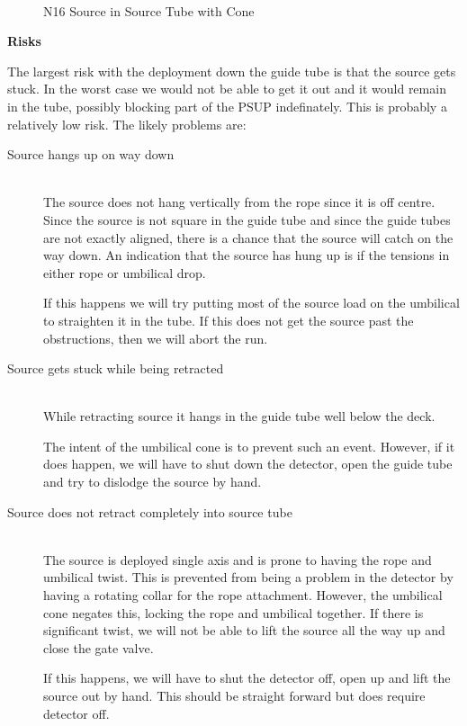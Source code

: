 \begin{figure}
\begin{center}
\leavevmode
\epsfxsize=7in
~\\
\caption[N16 source in Source Tube with Cone]
        {N16 Source in Source Tube with Cone
        } 
        
\end{center}
\end{figure}
  
 
\noindent
{\bf Risks}

  The largest risk with the deployment down the guide tube is
that the source gets stuck.  In the worst case we would not be
able to get it out and it would remain in the tube, possibly blocking
part of the PSUP indefinately.  This is probably a relatively low
risk.  The likely problems are:
\begin{description}
\item[Source hangs up on way down]~\\
  The source does not hang vertically from the rope since it is off centre.
  Since the source is not square in the guide tube and since the guide
  tubes are not exactly aligned, there is a chance that the source will
  catch on the way down. An indication that the source has hung up is
  if the tensions in either rope or umbilical drop.
  
  If this happens we will try putting most of the source load on the
  umbilical to straighten it in the tube.  If this does not get the source
  past the obstructions, then we will abort the run.

\item[Source gets stuck while being retracted]~\\
  While retracting source it hangs in the guide tube well below the
  deck.  
  
  The intent of the umbilical cone is to prevent such an event.  However,
  if it does happen, we will have to shut down the detector, open the
  guide tube and try to dislodge the source by hand.
  
\item[Source does not retract completely into source tube]~\\
  The source is deployed single axis and is prone to having the
  rope and umbilical twist.  This is prevented from being a problem
  in the detector by having a rotating collar for the rope attachment.
  However, the umbilical cone negates this, locking the rope and umbilical
  together.  If there is significant twist, we will not be able to lift
  the source all the way up and close the gate valve.
  
  If this happens, we will have to shut the detector off, open up
  and lift the source out by hand.  This should be straight forward
  but does require detector off.
\end{description}



